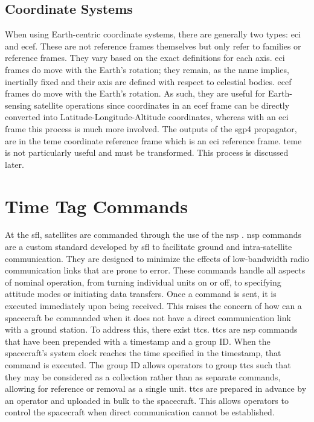 \subsection{Coordinate Systems}

When using Earth-centric coordinate systems, there are generally two types:
\gls{eci} and \gls{ecef}. These are not reference frames themselves but only
refer to families or reference frames. They vary based on the exact definitions
for each axis.  \gls{eci} frames do move with the Earth's rotation; they
remain, as the name implies, inertially fixed and their axis are defined with
respect to celestial bodies. \gls{ecef} frames do move with the Earth's
rotation. As such, they are useful for Earth-sensing satellite operations since
coordinates in an \gls{ecef} frame can be directly converted into
Latitude-Longitude-Altitude coordinates, whereas with an \gls{eci} frame this
process is much more involved. The outputs of the \gls{sgp4} propagator, are in
the \gls{teme} coordinate reference frame which is an \gls{eci} reference
frame. \gls{teme} is not particularly useful and must be transformed. This
process is discussed later.



\section{Time Tag Commands}

At the \gls{sfl}, satellites are commanded through the use of the \gls{nsp}
\cite{kekez_nanosatellite_2010}.  \gls{nsp} commands are a custom standard
developed by \gls{sfl} to facilitate ground and intra-satellite communication.
They are designed to minimize the effects of low-bandwidth radio communication
links that are prone to error.  These commands handle all aspects of nominal
operation, from turning individual units on or off, to specifying attitude
modes or initiating data transfers.  Once a command is sent, it is executed
immediately upon being received. This raises the concern of how can a
spacecraft be commanded when it does not have a direct communication link with
a ground station. To address this, there exist \glspl{ttc}.  \glspl{ttc} are
\gls{nsp} commands that have been prepended with a timestamp and a group ID.
When the spacecraft’s system clock reaches the time specified in the timestamp,
that command is executed.  The group ID allows operators to group \glspl{ttc}
such that they may be considered as a collection rather than as separate
commands, allowing for reference or removal as a single unit.  \glspl{ttc} are
prepared in advance by an operator and uploaded in bulk to the spacecraft.
This allows operators to control the spacecraft when direct communication
cannot be established.



